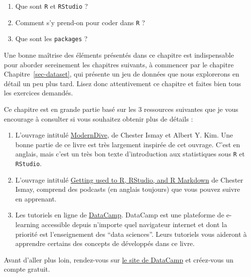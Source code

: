 \documentclass[
  letterpaper,
  DIV=11,
  numbers=noendperiod]{scrreprt}
\providecommand{\tightlist}{%
  \setlength{\itemsep}{0pt}\setlength{\parskip}{0pt}}\usepackage{longtable,booktabs,array}
\begin{document}
\begin{enumerate}
\def\labelenumi{\arabic{enumi}.}
\tightlist
\item
  Que sont \texttt{R} et \texttt{RStudio} ?
\item
  Comment s'y prend-on pour coder dans \texttt{R} ?
\item
  Que sont les \texttt{packages} ?
\end{enumerate}

Une bonne maîtrise des éléments présentés dans ce chapitre est
indispensable pour aborder sereinement les chapitres suivants, à
commencer par le chapitre Chapitre~\ref{sec-dataset}, qui présente un
jeu de données que nous explorerons en détail un peu plus tard. Lisez
donc attentivement ce chapitre et faites bien tous les exercices
demandés.

Ce chapitre est en grande partie basé sur les 3 ressources suivantes que
je vous encourage à consulter si vous souhaitez obtenir plus de détails
:

\begin{enumerate}
\def\labelenumi{\arabic{enumi}.}
\tightlist
\item
  L'ouvrage intitulé
  \href{https://moderndive.com/index.html}{ModernDive}, de Chester Ismay
  et Albert Y. Kim. Une bonne partie de ce livre est très largement
  inspirée de cet ouvrage. C'est en anglais, mais c'est un très bon
  texte d'introduction aux statistiques sous \texttt{R} et
  \texttt{RStudio}.
\item
  L'ouvrage intitulé
  \href{https://ismayc.github.io/rbasics-book/}{Getting used to R,
  RStudio, and R Markdown} de Chester Ismay, comprend des podcasts (en
  anglais toujours) que vous pouvez suivre en apprenant.
\item
  Les tutoriels en ligne de \href{https://datacamp.com/}{DataCamp}.
  DataCamp est une plateforme de e-learning accessible depuis n'importe
  quel navigateur internet et dont la priorité est l'enseignement des
  ``data sciences''. Leurs tutoriels vous aideront à apprendre certains
  des concepts de développés dans ce livre.
\end{enumerate}

\begin{tcolorbox}[enhanced jigsaw, bottomtitle=1mm, title=\textcolor{quarto-callout-important-color}{\faExclamation}\hspace{0.5em}{Important}, breakable, opacitybacktitle=0.6, coltitle=black, opacityback=0, toprule=.15mm, toptitle=1mm, titlerule=0mm, colback=white, rightrule=.15mm, arc=.35mm, leftrule=.75mm, bottomrule=.15mm, left=2mm, colframe=quarto-callout-important-color-frame, colbacktitle=quarto-callout-important-color!10!white]
Avant d'aller plus loin, rendez-vous sur
\href{https://www.datacamp.com/}{le site de DataCamp} et créez-vous un
compte gratuit.
\end{tcolorbox}
\end{document}
